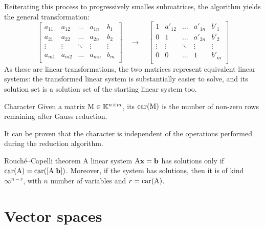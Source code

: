 Reiterating this process to progressively smalles submatrices, the algorithm yields the general transformation:
\begin{equation*}
  \left[
  \begin{array}{cccc|c}
    a_{11} & a_{12} & \dots & a_{1n} & b_1 \\
    a_{21} & a_{22} & \dots & a_{2n} & b_2 \\
    \vdots & \vdots & \ddots & \vdots & \vdots \\
    a_{m1} & a_{m2} & \dots & a_{mn} & b_m \\
  \end{array}
  \right]
  \quad \longrightarrow \quad
  \left[
  \begin{array}{cccc|c}
    1 & a'_{12} & \dots & a'_{1n} & b'_1 \\
    0 & 1 & \dots & a'_{2n} & b'_2 \\
    \vdots & \vdots & \ddots & \vdots & \vdots \\
    0 & 0 & \dots & 1 & b'_m \\
  \end{array}
  \right]
\end{equation*}
As these are linear transformations, the two matrices represent equivalent linear systems: the transformed linear system is substantially easier to solve, and its solution set is a solution set of the starting linear system too.

\begin{definition}{Character}{}
  Given a matrix $ \mathrm{M} \in \mathbb{K}^{n \times m} $, its  $ \mathrm{car}(\mathrm{M}) $ is the number of non-zero rows remaining after Gauss reduction.
\end{definition}

It can be proven that the character is independent of the operations performed during the reduction algorithm.

\begin{theorem}{Rouché--Capelli theorem}{}
  A linear system $ \mathrm{A} \mathbf{x} = \mathbf{b} $ has solutions only if $ \mathrm{car}(\mathrm{A}) = \mathrm{car}([\mathrm{A} | \mathbf{b}]) $. Moreover, if the system has solutions, then it is of kind $ \infty^{n - r} $, with $ n $ number of variables and $ r = \mathrm{car}(\mathrm{A}) $.
\end{theorem}

\section{Vector spaces}

